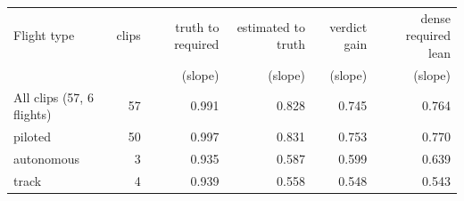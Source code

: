 \footnotesize
\begin{tabular}{lrrrrr}
\toprule
Flight type & clips & truth to required & estimated to truth & verdict gain & dense required lean \\
 & & (slope) & (slope) & (slope) & (slope) \\
\midrule
All clips (57, 6 flights) & 57 & 0.991 & 0.828 & 0.745 & 0.764 \\
piloted & 50 & 0.997 & 0.831 & 0.753 & 0.770 \\
autonomous & 3 & 0.935 & 0.587 & 0.599 & 0.639 \\
track & 4 & 0.939 & 0.558 & 0.548 & 0.543 \\
\bottomrule
\end{tabular}

